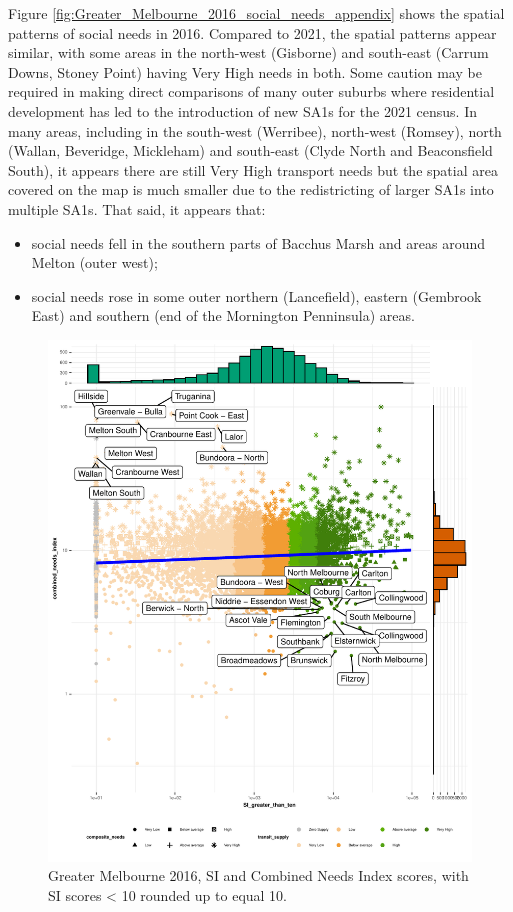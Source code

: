 \documentclass[preprint, 3p,
authoryear]{elsarticle} %
\providecommand{\tightlist}{%
  \setlength{\itemsep}{0pt}\setlength{\parskip}{0pt}}
\begin{document}
Figure \ref{fig:Greater_Melbourne_2016_social_needs_appendix} shows the
spatial patterns of social needs in 2016. Compared to 2021, the spatial
patterns appear similar, with some areas in the north-west (Gisborne)
and south-east (Carrum Downs, Stoney Point) having Very High needs in
both. Some caution may be required in making direct comparisons of many
outer suburbs where residential development has led to the introduction
of new SA1s for the 2021 census. In many areas, including in the
south-west (Werribee), north-west (Romsey), north (Wallan, Beveridge,
Mickleham) and south-east (Clyde North and Beaconsfield South), it
appears there are still Very High transport needs but the spatial area
covered on the map is much smaller due to the redistricting of larger
SA1s into multiple SA1s. That said, it appears that:

\begin{itemize}
\tightlist
\item
  social needs fell in the southern parts of Bacchus Marsh and areas
  around Melton (outer west);
\item
  social needs rose in some outer northern (Lancefield), eastern
  (Gembrook East) and southern (end of the Mornington Penninsula) areas.
\end{itemize}

\begin{figure}
\centering
\includegraphics{ReynoldsCurrieQu2024_files/figure-latex/Greater_Melbourne_2016_needs_gap_scatterplot_figure-1.pdf}
\caption{Greater Melbourne 2016, SI and Combined Needs Index scores,
with SI scores \textless{} 10 rounded up to equal 10.}
\end{figure}


\end{document}
